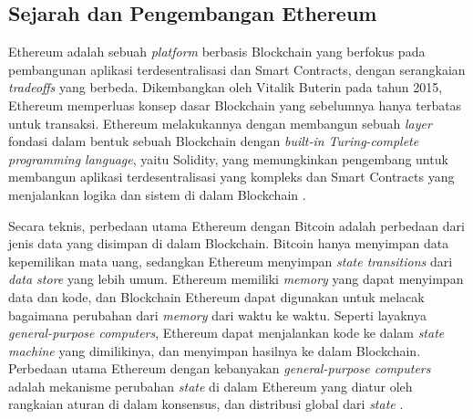 \subsection{Sejarah dan Pengembangan Ethereum}
\label{subsec:sejarah-pengembangan-ethereum}

Ethereum adalah sebuah \textit{platform} berbasis Blockchain yang berfokus pada pembangunan aplikasi terdesentralisasi dan Smart Contracts, dengan serangkaian \textit{tradeoffs} yang berbeda.
Dikembangkan oleh Vitalik Buterin pada tahun 2015, Ethereum memperluas konsep dasar Blockchain yang sebelumnya hanya terbatas untuk transaksi. Ethereum melakukannya dengan membangun sebuah \textit{layer} fondasi dalam bentuk sebuah Blockchain dengan \textit{built-in Turing-complete programming language}, yaitu Solidity, yang memungkinkan pengembang untuk membangun aplikasi terdesentralisasi yang kompleks dan Smart Contracts yang menjalankan logika dan sistem di dalam Blockchain \parencite{buterin2013ethereum}.

Secara teknis, perbedaan utama Ethereum dengan Bitcoin adalah perbedaan dari jenis data yang disimpan di dalam Blockchain. Bitcoin hanya menyimpan data kepemilikan mata uang, sedangkan Ethereum menyimpan \textit{state transitions} dari \textit{data store} yang lebih umum. Ethereum memiliki \textit{memory} yang dapat menyimpan data dan kode, dan Blockchain Ethereum dapat digunakan untuk melacak bagaimana perubahan dari \textit{memory} dari waktu ke waktu. Seperti layaknya \textit{general-purpose computers}, Ethereum dapat menjalankan kode ke dalam \textit{state machine} yang dimilikinya, dan menyimpan hasilnya ke dalam Blockchain. Perbedaan utama Ethereum dengan kebanyakan \textit{general-purpose computers} adalah mekanisme perubahan \textit{state} di dalam Ethereum yang diatur oleh rangkaian aturan di dalam konsensus, dan distribusi global dari \textit{state} \parencite{antonopoulos2018mastering}.



